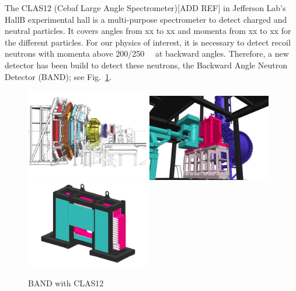 \documentclass[review]{elsarticle}
\begin{document}
The CLAS12 (Cebaf Large Angle Spectrometer)[ADD REF] in Jefferson Lab's HallB experimental hall is a multi-purpose spectrometer to detect charged and neutral particles. It covers angles from xx to xx and momenta from xx to xx for the different particles. For our physics of interest, it is necessary to detect recoil neutrons with momenta above \SI{200/250}{\mega\eVperc} at backward angles. Therefore, a new detector has been build to detect these neutrons, the Backward Angle Neutron Detector (BAND); see Fig.~\ref{fig:clas12}.

\begin{figure}[h]
	\centering
	\includegraphics[width=0.48\textwidth]{BandInClas.pdf}
	\includegraphics[width=0.48\textwidth]{FULL_CONTEXT_STUDIE_3.png}
	\includegraphics[width=0.48\textwidth]{BAND_1-2.png}
		\caption{BAND with CLAS12}
		\label{fig:clas12}
\end{figure}


\end{document}

